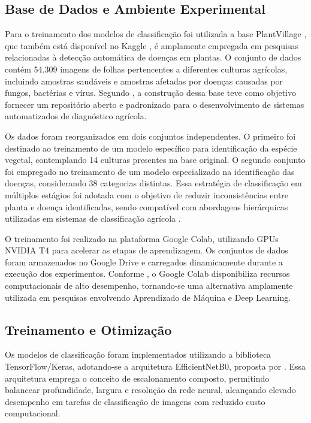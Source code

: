 \documentclass[portuguese]{sbc2025}%
\begin{document}
\subsection{Base de Dados e Ambiente Experimental}

Para o treinamento dos modelos de classificação foi utilizada a base PlantVillage \citep{ref17}, que também está disponível no
Kaggle \citep{ref7}, é  amplamente empregada em pesquisas relacionadas à detecção automática de doenças em plantas. O conjunto
de dados contém 54.309 imagens de folhas pertencentes a diferentes culturas agrícolas, incluindo amostras saudáveis e amostras
afetadas por doenças causadas por fungos, bactérias e vírus. Segundo \citep{ref17}, a construção dessa base teve 
como objetivo fornecer um repositório aberto e padronizado para o desenvolvimento de sistemas automatizados de diagnóstico 
agrícola. 

Os dados foram reorganizados em dois conjuntos independentes. O primeiro foi destinado ao treinamento de um modelo específico 
para identificação da espécie vegetal, contemplando 14 culturas presentes na base original. O segundo conjunto foi empregado 
no treinamento de um modelo especializado na identificação das doenças, considerando 38 categorias distintas. Essa estratégia 
de classificação em múltiplos estágios foi adotada com o objetivo de reduzir inconsistências entre planta e doença identificadas,
sendo compatível com abordagens hierárquicas utilizadas em sistemas de classificação agrícola \citep{ref2}.

O treinamento foi realizado na plataforma Google Colab, utilizando GPUs NVIDIA T4 para acelerar as etapas de aprendizagem. 
Os conjuntos de dados foram armazenados no Google Drive e carregados dinamicamente durante a execução dos experimentos. 
Conforme \citep{ref18}, o Google Colab disponibiliza recursos computacionais de alto desempenho, tornando-se uma alternativa 
amplamente utilizada em pesquisas envolvendo Aprendizado de Máquina e Deep Learning. 

\subsection{Treinamento e Otimização}

Os modelos de classificação foram implementados utilizando a biblioteca TensorFlow/Keras, adotando-se a arquitetura EfficientNetB0,
proposta por \citep{ref4}. Essa arquitetura emprega o conceito de escalonamento composto, permitindo balancear 
profundidade, largura e resolução da rede neural, alcançando elevado desempenho em tarefas de classificação de imagens com 
reduzido custo computacional.
\end{document}
